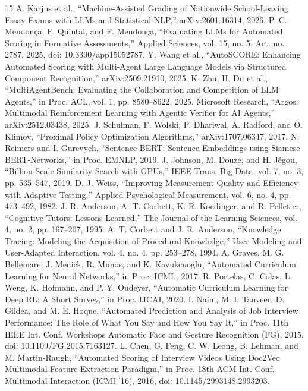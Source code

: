 \documentclass[conference]{IEEEtran}
\begin{document}
\begin{thebibliography}{15}
 A. Karjus et al., ``Machine-Assisted Grading of Nationwide School-Leaving Essay Exams with LLMs and Statistical NLP,'' arXiv:2601.16314, 2026.
 P. C. Mendon\c{c}a, F. Quintal, and F. Mendon\c{c}a, ``Evaluating LLMs for Automated Scoring in Formative Assessments,'' Applied Sciences, vol. 15, no. 5, Art. no. 2787, 2025, doi: 10.3390/app15052787.
 Y. Wang et al., ``AutoSCORE: Enhancing Automated Scoring with Multi-Agent Large Language Models via Structured Component Recognition,'' arXiv:2509.21910, 2025.
 K. Zhu, H. Du et al., ``MultiAgentBench: Evaluating the Collaboration and Competition of LLM Agents,'' in Proc. ACL, vol. 1, pp. 8580--8622, 2025.
 Microsoft Research, ``Argos: Multimodal Reinforcement Learning with Agentic Verifier for AI Agents,'' arXiv:2512.03438, 2025.
 J. Schulman, F. Wolski, P. Dhariwal, A. Radford, and O. Klimov, ``Proximal Policy Optimization Algorithms,'' arXiv:1707.06347, 2017.
 N. Reimers and I. Gurevych, ``Sentence-BERT: Sentence Embeddings using Siamese BERT-Networks,'' in Proc. EMNLP, 2019.
 J. Johnson, M. Douze, and H. J\'egou, ``Billion-Scale Similarity Search with GPUs,'' IEEE Trans. Big Data, vol. 7, no. 3, pp. 535--547, 2019.
 D. J. Weiss, ``Improving Measurement Quality and Efficiency with Adaptive Testing,'' Applied Psychological Measurement, vol. 6, no. 4, pp. 473--492, 1982.
 J. R. Anderson, A. T. Corbett, K. R. Koedinger, and R. Pelletier, ``Cognitive Tutors: Lessons Learned,'' The Journal of the Learning Sciences, vol. 4, no. 2, pp. 167--207, 1995.
 A. T. Corbett and J. R. Anderson, ``Knowledge Tracing: Modeling the Acquisition of Procedural Knowledge,'' User Modeling and User-Adapted Interaction, vol. 4, no. 4, pp. 253--278, 1994.
 A. Graves, M. G. Bellemare, J. Menick, R. Munos, and K. Kavukcuoglu, ``Automated Curriculum Learning for Neural Networks,'' in Proc. ICML, 2017.
 R. Portelas, C. Colas, L. Weng, K. Hofmann, and P. Y. Oudeyer, ``Automatic Curriculum Learning for Deep RL: A Short Survey,'' in Proc. IJCAI, 2020.
 I. Naim, M. I. Tanveer, D. Gildea, and M. E. Hoque, ``Automated Prediction and Analysis of Job Interview Performance: The Role of What You Say and How You Say It,'' in Proc. 11th IEEE Int. Conf. Workshops Automatic Face and Gesture Recognition (FG), 2015, doi: 10.1109/FG.2015.7163127.
 L. Chen, G. Feng, C. W. Leong, B. Lehman, and M. Martin-Raugh, ``Automated Scoring of Interview Videos Using Doc2Vec Multimodal Feature Extraction Paradigm,'' in Proc. 18th ACM Int. Conf. Multimodal Interaction (ICMI '16), 2016, doi: 10.1145/2993148.2993203.
\end{thebibliography}
\end{document}
